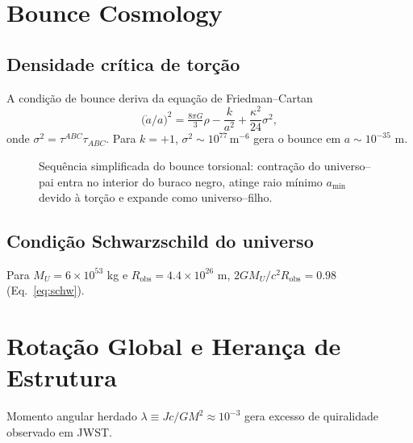 \documentclass[aps,prd,reprint,amsmath,amssymb,nofootinbib]{revtex4-2}
\begin{document}
\section{Bounce Cosmology}\label{sec:bounce}
\subsection{Densidade crítica de torção}
A condição de bounce deriva da equação de Friedman--Cartan
\begin{equation}
 \bigl(\dot a/a\bigr)^{2}=\tfrac{8\pi G}{3}\rho-\dfrac{k}{a^{2}}+\dfrac{\kappa^{2}}{24}\sigma^{2},\label{eq:friedmann}
\end{equation}
onde $\sigma^{2}=\tau^{ABC}\tau_{ABC}$. Para $k=+1$, $\sigma^{2}\sim10^{77}\,\text{m}^{-6}$ gera o bounce em $a\sim10^{-35}$ m.

\begin{figure}[h]
 \centering
 \caption{Sequência simplificada do bounce torsional: contração do universo--pai entra no interior do buraco negro, atinge raio mínimo $a_{\min}$ devido à torção e expande como universo--filho.}
 \label{fig:bounce}
\end{figure}

\subsection{Condição Schwarzschild do universo}
Para $M_{U}=6\times10^{53}$ kg e $R_{\text{obs}}=4.4\times10^{26}$ m, $2GM_{U}/c^{2}R_{\text{obs}}=0.98$ (Eq.~\eqref{eq:schw}).

\section{Rotação Global e Herança de Estrutura}\label{sec:rotation}
Momento angular herdado $\lambda\equiv Jc/GM^{2}\approx10^{-3}$ gera excesso de quiralidade observado em JWST.
\end{document}
